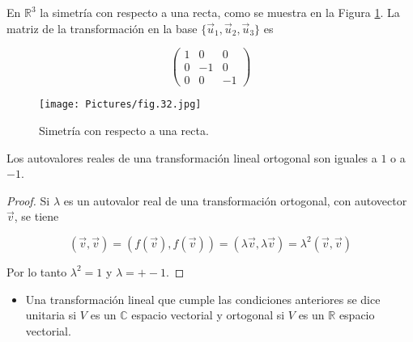 {\bigskip


 \begin{example} 
En $\mathbb{R}^{3}$ la simetría con respecto a una recta, como se muestra  en la  Figura  \ref{SIM_3}.
La matriz de la transformación en la base $\{ \vec{u}_1, \vec{u}_2, \vec{u}_3  \}$ es 

\bigskip


$$\left(\begin{array}{ccc} 1  & 0  & 0  \\ 0 & -1 & 0  \\ 0 & 0 & -1
\end{array}
 \right)$$
\end{example} 

\begin{figure}
    \centering
    \texttt{[image: Pictures/fig.32.jpg]}
    \caption{Simetría con respecto a una recta.}
    \label{SIM_3}
\end{figure} 


\bigskip

 



\bigskip

\begin{theorem}
\label{det1ortog}

Los autovalores reales de una  transformación lineal ortogonal son iguales a $1$ o a $-1$.


\begin{proof}

Si $\lambda$ es un autovalor real de una transformación ortogonal, con autovector  $\vec{v}$, se tiene

$$(\vec{v},\vec{v})=(f(\vec{v}),f(\vec{v}))= ( \lambda \vec{v}, \lambda \vec{v})= \lambda ^2 (\vec{v},\vec{v})$$

Por lo tanto $ \lambda ^2 = 1$  y $ \lambda  = +- 1$. 

  \end{proof}
  \end{theorem}
\bigskip


\begin{remark} 
\begin{itemize}
    \item 

Una transformación lineal que cumple las  condiciones anteriores se dice unitaria  si $V$ es un $\mathbb{C}$ espacio vectorial y ortogonal si $V$ es un   $\mathbb{R}$ espacio vectorial.


\end{itemize}
\end{remark}}
